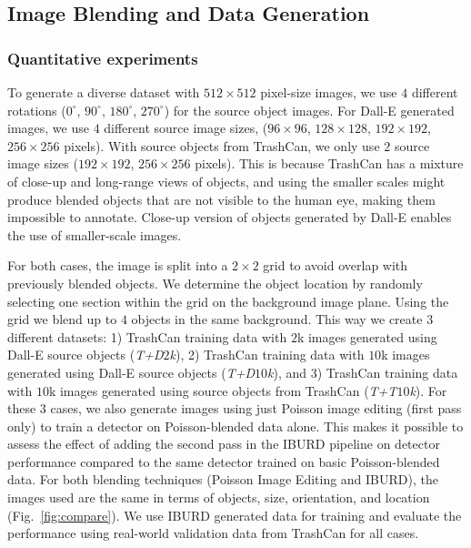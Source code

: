 \subsection{Image Blending and Data Generation} 
\label{subsec:data_gen}
\subsubsection{Quantitative experiments}
\label{subsec:blend_quant}
To generate a diverse dataset with $512\times512$ pixel-size images, we use $4$ different rotations ($0^{\circ}$, $90^{\circ}$, $180^{\circ}$, $270^{\circ}$) for the source object images. 
For Dall-E generated images, we use $4$ different source image sizes,
 ($96\times96$, $128\times128$, $192\times192$, $256\times256$ pixels). 
With source objects from TrashCan, we only use $2$ source image sizes ($192\times192$, $256\times256$ pixels).
This is because TrashCan has a mixture of close-up and long-range views of objects, and using the smaller scales might produce blended objects that are not visible to the human eye, making them impossible to annotate. Close-up version of objects generated by Dall-E enables the use of smaller-scale images.


For both cases, the image is split into a $2\times2$ grid to avoid overlap with previously blended objects. We determine the object location by randomly selecting one section within the grid on the background image plane. Using the grid we blend up to $4$ objects in the same background. This way we create $3$ different datasets: 1) TrashCan training data with $2$k images generated using Dall-E source objects (\textit{T+D$2$k}), 2) TrashCan training data with $10$k images generated using Dall-E source objects (\textit{T+D$10$k}), and 3) TrashCan training data with $10$k images generated using source objects from TrashCan (\textit{T+T$10$k}). 
For these $3$ cases, we also generate images using just Poisson image editing (\ie first pass only) to train a detector on Poisson-blended data alone. This makes it possible to assess the effect of adding the second pass in the IBURD pipeline on detector performance compared to the same detector trained on basic Poisson-blended data. For both blending techniques (Poisson Image Editing and IBURD), the images used are the same in terms of objects, size, orientation, and location (\eg Fig.~\ref{fig:compare}). We use IBURD generated data for training and evaluate the performance using real-world validation data from TrashCan for all cases.



